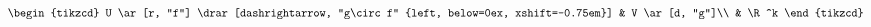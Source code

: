 $$
\begin{tikzcd}
	U \ar[r, "f"] \drar[dashrightarrow, "g\circ f" {left, below=0ex, xshift=-0.75em}]
	& V \ar[d, "g"]\\
	& \R^k
\end{tikzcd}
$$
